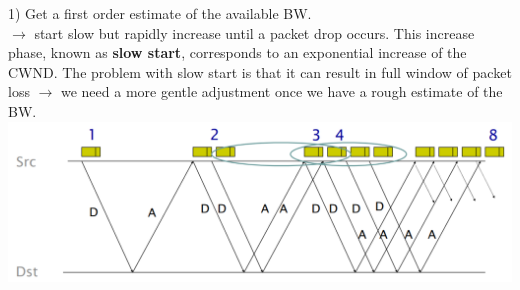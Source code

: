 \documentclass[a4paper, fontsize=8pt, landscape, DIV=1]{scrartcl}
\begin{document}
\begin{multicols*}{4}
		1) Get a first order estimate of the available BW.\\
		$\rightarrow$ start slow but rapidly increase until a packet drop occurs. This increase phase, known as \textbf{slow start}, corresponds to an exponential increase of the CWND. The problem with slow start is that it can result in full window of packet loss $\rightarrow$ we need a more gentle adjustment once we have a rough estimate of the BW.\\ 
		\includegraphics[width=\columnwidth]{images/Transport_Layer/slow_start.png}
		\par 
		

\end{multicols*}
\end{document}
